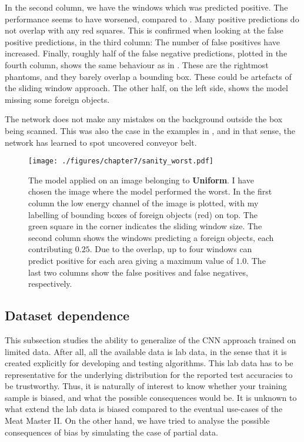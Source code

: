 In the second column, we have the windows which was predicted positive. The performance seems to have worsened, compared to . Many positive predictions do not overlap with any red squares. 
This is confirmed when looking at the false positive predictions, in the third column: The number of false positives have increased.
Finally, roughly half of the false negative predictions, plotted in the fourth column, shows the same behaviour as in . These are the rightmost phantoms, and they barely overlap a bounding box. These could be artefacts of the sliding window approach. The other half, on the left side, shows the model missing some foreign objects.

The network does not make any mistakes on the background outside the box being scanned. This was also the case in the examples in , and in that sense, the network has learned to spot uncovered conveyor belt.

\begin{figure}[h]
	\begin{whole}
		\texttt{[image: ./figures/chapter7/sanity\_worst.pdf]}
		\caption{The model applied on an image belonging to \textbf{Uniform}. I have chosen the image where the model performed the worst. In the first column the low energy channel of the image is plotted, with my labelling of bounding boxes of foreign objects (red) on top. The green square in the corner indicates the sliding window size. The second column shows the windows predicting a foreign objects, each contributing $0.25$. Due to the overlap, up to four windows can predict positive for each area giving a maximum value of $1.0$. The last two columns show the false positives and false negatives, respectively.}
		\label{fig:sanity}
	\end{whole}
\end{figure}

\subsection{Dataset dependence}
\label{sec:ddependence}
This subsection studies the ability to generalize of the \ac{CNN} approach trained on limited data.
After all, all the available data is lab data, in the sense that it is created explicitly for developing and testing algorithms. 
This lab data has to be representative for the underlying distribution for the reported test accuracies to be trustworthy.
Thus, it is naturally of interest to know whether your training sample is biased, and what the possible consequences would be.
It is unknown to what extend the lab data is biased compared to the eventual use-cases of the Meat Master II.
On the other hand, we have tried to analyse the possible consequences of bias by simulating the case of partial data. 

